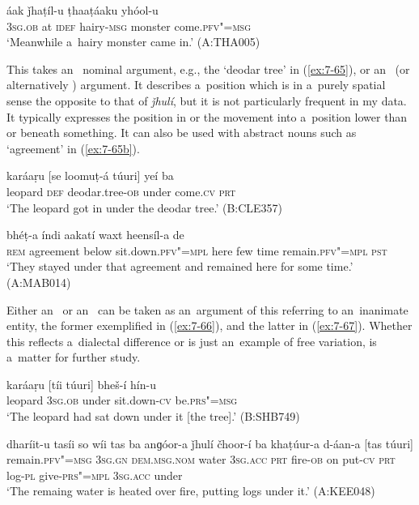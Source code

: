 \begin{exe}
\ex
\label{ex:7-64}
 áak ǰhaṭíl-u ṭhaaṭáaku yhóol-u \\
\textsc{3sg.ob} at \textsc{idef} hairy-\textsc{msg} monster come.\textsc{pfv"=msg} \\
\glt `Meanwhile a~hairy monster came in.' (A:THA005)
\end{exe}

 This  takes an~ nominal argument, e.g., the `deodar tree' in (\ref{ex:7-65}), or an~ (or alternatively )  argument. It describes a~position which is in a~purely spatial sense the opposite to that of \textit{ǰhulí}, but it is not particularly frequent in my data. It typically expresses the position in or the movement into a~position lower than or beneath something. It can also be used with abstract nouns such as `agreement' in  (\ref{ex:7-65b}).

\begin{exe}
\ex
\label{ex:7-65}
\gll karáaṛu [se loomuṭ-á túuri] yeí ba \\
leopard \textsc{def} deodar.tree-\textsc{ob} under come.\textsc{cv} \textsc{prt} \\
\glt `The leopard got in under the deodar tree.' (B:CLE357)

\ex
\label{ex:7-65b}
 bhéṭ-a índi aakatí waxt heensíl-a de\\
\textsc{rem} agreement below sit.down.\textsc{pfv"=mpl} here few time remain.\textsc{pfv"=mpl} \textsc{pst}\\
\glt `They stayed under that agreement and remained here for some time.' (A:MAB014)
\end{exe}

Either an~ or an~  can be taken as an~argument of this  referring to an~inanimate entity, the former exemplified in (\ref{ex:7-66}), and the latter in (\ref{ex:7-67}). Whether this reflects a~dialectal difference or is just an~example of free variation, is a~matter for further study.

\begin{exe}
\ex
\label{ex:7-66}
\gll karáaṛu [tíi túuri] bheš-í hín-u \\
leopard \textsc{3sg.ob} under sit.down-\textsc{cv} be.\textsc{prs"=msg } \\
\glt `The leopard had sat down under it [the tree].' (B:SHB749)
\end{exe}
\begin{exe}
\ex
\label{ex:7-67}
\gll dharíit-u tasíi so wíi tas ba anɡóor-a ǰhulí čhoor-í ba
khaṭúur-a d-áan-a [tas túuri] \\
remain.\textsc{pfv"=msg} \textsc{3sg.gn} \textsc{dem.msg.nom} water \textsc{3sg.acc} \textsc{prt}  fire-\textsc{ob} on put-\textsc{cv} \textsc{prt} log-\textsc{pl} give-\textsc{prs"=mpl } \textsc{3sg.acc} under   \\
\glt `The remaing water is heated over fire, putting logs under it.' (A:KEE048)
\end{exe}

